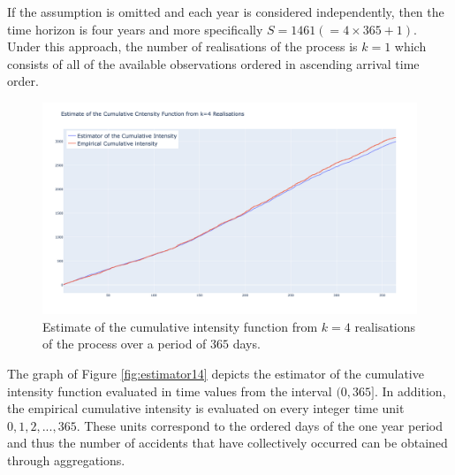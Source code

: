\documentclass[12pt]{article}
\theoremstyle{definition}
\begin{document}
If the assumption is omitted and each year is considered independently, then the time horizon is four years and more specifically $S=1461(=4\times 365 +1)$. Under this approach, the number of realisations of the process is $k=1$ which consists of all of the available observations ordered in ascending arrival time order. 

\begin{figure}
    \centering
    \includegraphics[width=12cm]{images/estimatorKfull.png}
    \caption{Estimate of the cumulative intensity function from $k=4$ realisations of the process over a period of $365$ days.}
    \label{fig:estimatorK}
\end{figure}

The graph of Figure \ref{fig:estimator14} depicts the estimator of the cumulative intensity function evaluated in time values from the interval $(0, 365]$. In addition, the empirical cumulative intensity is evaluated on every integer time unit $0,1,2,...,365$. These units correspond to the ordered days of the one year period and thus the number of accidents that have collectively occurred can be obtained through aggregations.
\end{document}
